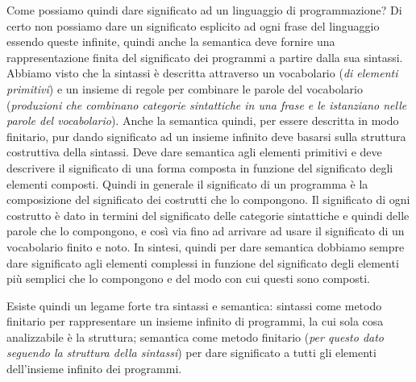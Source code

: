 \documentclass[oneside,a4paper,11pt]{book}
\theoremstyle{italicstyle}
\theoremstyle{normStyle}
\begin{document}
Come possiamo quindi dare significato ad un linguaggio di programmazione? Di certo non possiamo dare un significato esplicito 
ad ogni frase del linguaggio essendo queste infinite, quindi anche la semantica 
deve fornire una rappresentazione finita del significato dei programmi a partire dalla sua 
sintassi.
Abbiamo visto che la sintassi è descritta attraverso un vocabolario (\textit{di elementi primitivi}) e
un insieme di regole per combinare le parole del vocabolario (\textit{produzioni che combinano categorie sintattiche
in una frase e le istanziano nelle parole del vocabolario}). 
Anche la semantica quindi, per essere descritta in modo finitario,
pur dando significato ad un insieme infinito deve basarsi sulla struttura
costruttiva della sintassi. Deve dare
semantica agli elementi primitivi e deve descrivere il
significato di una forma composta in funzione del significato
degli elementi composti. Quindi in generale il significato di un
programma è la composizione del significato dei costrutti che lo compongono.
Il significato di ogni costrutto è dato in termini del significato delle categorie
sintattiche e quindi delle parole che lo compongono, e così via fino ad arrivare
ad usare il significato di un vocabolario finito e noto. In sintesi,
quindi per dare semantica dobbiamo sempre dare significato agli elementi
complessi in funzione del significato degli elementi più semplici che lo compongono e
del modo con cui questi sono composti.

Esiste quindi un legame forte tra sintassi e semantica: sintassi
come metodo finitario per rappresentare un insieme infinito
di programmi, la cui sola cosa analizzabile è la struttura;
semantica come metodo finitario (\textit{per questo dato seguendo
la struttura della sintassi}) per dare significato a tutti gli
elementi dell'insieme infinito dei programmi.
\end{document}

